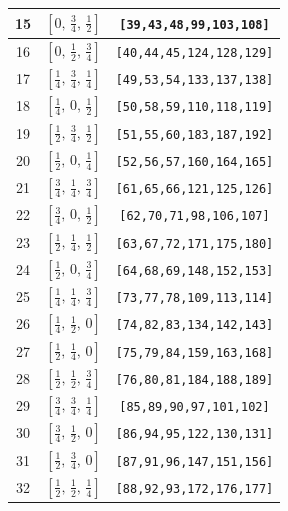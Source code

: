 \documentclass[fleqn,8pt]{jsarticle}
\begin{document}
\begin{longtable}{ccc}
15 & $\left[ 0,\, \frac{3}{4},\, \frac{1}{2} \right]$ & {\tt [39,43,48,99,103,108]} \\ \hline
16 & $\left[ 0,\, \frac{1}{2},\, \frac{3}{4} \right]$ & {\tt [40,44,45,124,128,129]} \\ \hline
17 & $\left[ \frac{1}{4},\, \frac{3}{4},\, \frac{1}{4} \right]$ & {\tt [49,53,54,133,137,138]} \\ \hline
18 & $\left[ \frac{1}{4},\, 0,\, \frac{1}{2} \right]$ & {\tt [50,58,59,110,118,119]} \\ \hline
19 & $\left[ \frac{1}{2},\, \frac{3}{4},\, \frac{1}{2} \right]$ & {\tt [51,55,60,183,187,192]} \\ \hline
20 & $\left[ \frac{1}{2},\, 0,\, \frac{1}{4} \right]$ & {\tt [52,56,57,160,164,165]} \\ \hline
21 & $\left[ \frac{3}{4},\, \frac{1}{4},\, \frac{3}{4} \right]$ & {\tt [61,65,66,121,125,126]} \\ \hline
22 & $\left[ \frac{3}{4},\, 0,\, \frac{1}{2} \right]$ & {\tt [62,70,71,98,106,107]} \\ \hline
23 & $\left[ \frac{1}{2},\, \frac{1}{4},\, \frac{1}{2} \right]$ & {\tt [63,67,72,171,175,180]} \\ \hline
24 & $\left[ \frac{1}{2},\, 0,\, \frac{3}{4} \right]$ & {\tt [64,68,69,148,152,153]} \\ \hline
25 & $\left[ \frac{1}{4},\, \frac{1}{4},\, \frac{3}{4} \right]$ & {\tt [73,77,78,109,113,114]} \\ \hline
26 & $\left[ \frac{1}{4},\, \frac{1}{2},\, 0 \right]$ & {\tt [74,82,83,134,142,143]} \\ \hline
27 & $\left[ \frac{1}{2},\, \frac{1}{4},\, 0 \right]$ & {\tt [75,79,84,159,163,168]} \\ \hline
28 & $\left[ \frac{1}{2},\, \frac{1}{2},\, \frac{3}{4} \right]$ & {\tt [76,80,81,184,188,189]} \\ \hline
29 & $\left[ \frac{3}{4},\, \frac{3}{4},\, \frac{1}{4} \right]$ & {\tt [85,89,90,97,101,102]} \\ \hline
30 & $\left[ \frac{3}{4},\, \frac{1}{2},\, 0 \right]$ & {\tt [86,94,95,122,130,131]} \\ \hline
31 & $\left[ \frac{1}{2},\, \frac{3}{4},\, 0 \right]$ & {\tt [87,91,96,147,151,156]} \\ \hline
32 & $\left[ \frac{1}{2},\, \frac{1}{2},\, \frac{1}{4} \right]$ & {\tt [88,92,93,172,176,177]} \\
\end{longtable}
\renewcommand{\arraystretch}{1.2}
\end{document}
